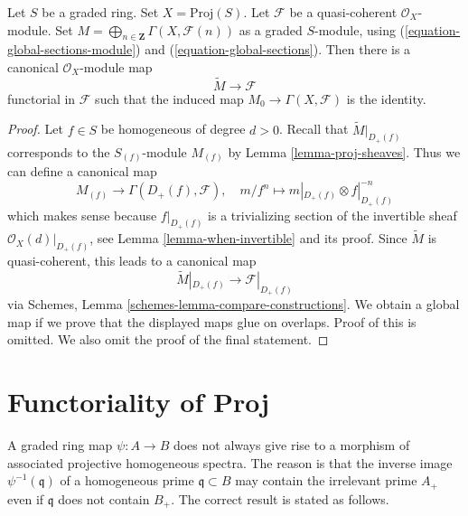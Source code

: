 \begin{lemma}
\label{lemma-comparison-proj-quasi-coherent}
Let $S$ be a graded ring. Set $X = \text{Proj}(S)$.
Let $\mathcal{F}$ be a quasi-coherent $\mathcal{O}_X$-module.
Set $M = \bigoplus_{n \in \mathbf{Z}} \Gamma(X, \mathcal{F}(n))$ as
a graded $S$-module, using
(\ref{equation-global-sections-module}) and (\ref{equation-global-sections}).
Then there is a canonical $\mathcal{O}_X$-module map
$$
\widetilde{M} \longrightarrow \mathcal{F}
$$
functorial in $\mathcal{F}$ such that the induced map
$M_0 \to \Gamma(X, \mathcal{F})$ is the identity.
\end{lemma}

\begin{proof}
Let $f \in S$ be homogeneous of degree $d > 0$. Recall that
$\widetilde{M}|_{D_{+}(f)}$ corresponds to the
$S_{(f)}$-module $M_{(f)}$ by Lemma \ref{lemma-proj-sheaves}.
Thus we can define a canonical map
$$
M_{(f)} \longrightarrow \Gamma(D_+(f), \mathcal{F}),\quad
m/f^n \longmapsto m|_{D_+(f)} \otimes f|_{D_+(f)}^{-n}
$$
which makes sense because $f|_{D_+(f)}$ is a trivializing
section of the invertible sheaf $\mathcal{O}_X(d)|_{D_+(f)}$, see
Lemma \ref{lemma-when-invertible} and its proof.
Since $\widetilde{M}$ is quasi-coherent, this leads to a canonical
map
$$
\widetilde{M}|_{D_+(f)} \longrightarrow \mathcal{F}|_{D_+(f)}
$$
via Schemes, Lemma \ref{schemes-lemma-compare-constructions}.
We obtain a global map if we prove that the displayed maps glue on overlaps.
Proof of this is omitted. We also omit the proof of the final statement.
\end{proof}










\section{Functoriality of Proj}
\label{section-functoriality-proj}

\noindent
A graded ring map $\psi : A \to B$ does not always give rise to a morphism of
associated projective homogeneous spectra. The reason is that
the inverse image $\psi^{-1}(\mathfrak q)$
of a homogeneous prime $\mathfrak q \subset B$ may
contain the irrelevant prime $A_{+}$ even if $\mathfrak q$ does not
contain $B_{+}$.
The correct result is stated as follows.

